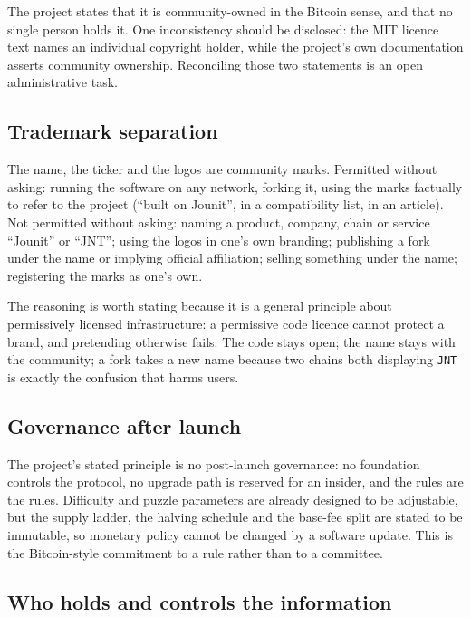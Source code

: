 \documentclass{article}
\begin{document}
The project states that it is community-owned in the Bitcoin sense, and that no
single person holds it. One inconsistency should be disclosed: the MIT licence
text names an individual copyright holder, while the project's own
documentation asserts community ownership. Reconciling those two statements is
an open administrative task.

\subsection{Trademark separation}

The name, the ticker and the logos are community marks. Permitted without
asking: running the software on any network, forking it, using the marks
factually to refer to the project (``built on Jounit'', in a compatibility list,
in an article). Not permitted without asking: naming a product, company, chain
or service ``Jounit'' or ``JNT''; using the logos in one's own branding;
publishing a fork under the name or implying official affiliation; selling
something under the name; registering the marks as one's own.

The reasoning is worth stating because it is a general principle about
permissively licensed infrastructure: a permissive code licence cannot protect
a brand, and pretending otherwise fails. The code stays open; the name stays
with the community; a fork takes a new name because two chains both displaying
\texttt{JNT} is exactly the confusion that harms users.

\subsection{Governance after launch}

The project's stated principle is no post-launch governance: no foundation
controls the protocol, no upgrade path is reserved for an insider, and the
rules are the rules. Difficulty and puzzle parameters are already designed to
be adjustable, but the supply ladder, the halving schedule and the base-fee
split are stated to be immutable, so monetary policy cannot be changed by a
software update. This is the Bitcoin-style commitment to a rule rather than to
a committee.

\subsection{Who holds and controls the information}
\end{document}
